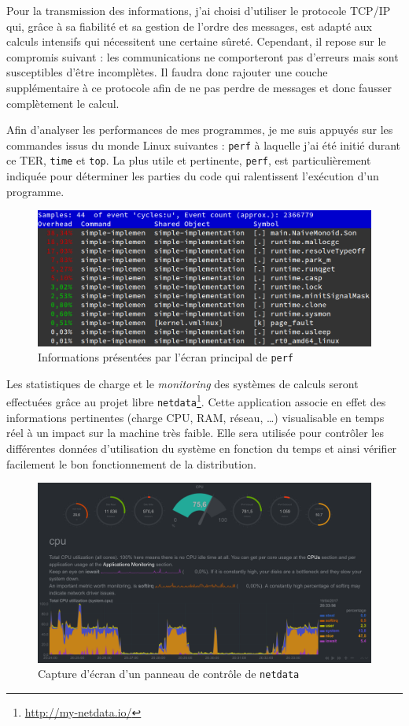 \documentclass[12pt,a4paper]{report}
\begin{document}
Pour la transmission des informations, j'ai choisi d'utiliser le protocole TCP/IP qui, grâce à sa fiabilité et sa gestion de l'ordre des messages, est adapté aux calculs intensifs qui nécessitent une certaine sûreté. Cependant, il repose sur le compromis suivant : les communications ne comporteront pas d'erreurs mais sont susceptibles d'être incomplètes. Il faudra donc rajouter une couche supplémentaire à ce protocole afin de ne pas perdre de messages et donc fausser complètement le calcul.

Afin d'analyser les performances de mes programmes, je me suis appuyés sur les commandes issus du monde Linux suivantes : \texttt{perf} à laquelle j'ai été initié durant ce TER, \texttt{time} et \texttt{top}. La plus utile et pertinente, \texttt{perf}, est particulièrement indiquée pour déterminer les parties du code qui ralentissent l'exécution d'un programme.

\begin{figure}[h]
	\centering
	\includegraphics[scale=0.35]{perf.png}
	\caption{Informations présentées par l'écran principal de \texttt{perf}}
\end{figure}

Les statistiques de charge et le \emph{monitoring} des systèmes de calculs seront effectuées grâce au projet libre \texttt{netdata}\footnote{\url{http://my-netdata.io/}}. Cette application associe en effet des informations pertinentes (charge CPU, RAM, réseau, \dots) visualisable en temps réel à un impact sur la machine très faible. Elle sera utilisée pour contrôler les différentes données d'utilisation du système en fonction du temps et ainsi vérifier facilement le bon fonctionnement de la distribution.

\begin{figure}[h]
	\centering
	\includegraphics[scale=0.125]{netdata.png}
	\caption{Capture d'écran d'un panneau de contrôle de \texttt{netdata}}
\end{figure}
\end{document}

